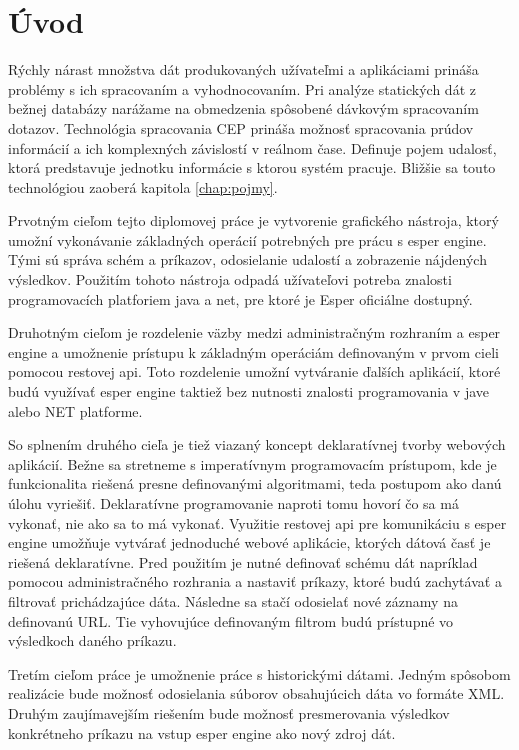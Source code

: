 \chapter*{Úvod}

Rýchly nárast množstva dát produkovaných užívateľmi a aplikáciami prináša problémy s ich spracovaním a vyhodnocovaním. Pri analýze statických dát z bežnej databázy narážame na obmedzenia spôsobené dávkovým spracovaním dotazov. Technológia spracovania \ac{CEP} prináša možnosť spracovania prúdov informácií a ich komplexných závislostí v reálnom čase. Definuje pojem udalosť, ktorá predstavuje jednotku informácie s ktorou systém pracuje. Bližšie sa touto technológiou zaoberá kapitola \ref{chap:pojmy}.

Prvotným cieľom tejto diplomovej práce je vytvorenie grafického nástroja, ktorý umožní vykonávanie základných operácií potrebných pre prácu s esper engine. Tými sú správa schém a príkazov, odosielanie udalostí a zobrazenie nájdených výsledkov. Použitím tohoto nástroja odpadá užívateľovi potreba znalosti programovacích platforiem java a net, pre ktoré je Esper oficiálne dostupný.

Druhotným cieľom je rozdelenie väzby medzi administračným rozhraním a esper engine a umožnenie prístupu k základným operáciám definovaným v prvom cieli pomocou restovej api. Toto rozdelenie umožní vytváranie ďalších aplikácií, ktoré budú využívať esper engine taktiež bez nutnosti znalosti programovania v jave alebo NET platforme.

So splnením druhého cieľa je tiež viazaný koncept deklaratívnej tvorby webových aplikácií. Bežne sa stretneme s imperatívnym programovacím prístupom, kde je funkcionalita riešená presne definovanými algoritmami, teda postupom ako danú úlohu vyriešiť. Deklaratívne programovanie naproti tomu hovorí čo sa má vykonať, nie ako sa to má vykonať.
Využitie restovej api pre komunikáciu s esper engine umožňuje vytvárať jednoduché webové aplikácie, ktorých dátová časť je riešená deklaratívne. Pred použitím je nutné definovať schému dát napríklad pomocou administračného rozhrania a nastaviť príkazy, ktoré budú zachytávať a filtrovať prichádzajúce dáta. Následne sa stačí odosielať nové záznamy na definovanú URL. Tie vyhovujúce definovaným filtrom budú prístupné vo výsledkoch daného príkazu.

Tretím cieľom práce je umožnenie práce s historickými dátami. Jedným spôsobom realizácie bude možnosť odosielania súborov obsahujúcich dáta vo formáte XML. Druhým zaujímavejším riešením bude možnosť presmerovania výsledkov konkrétneho príkazu na vstup esper engine ako nový zdroj dát.

